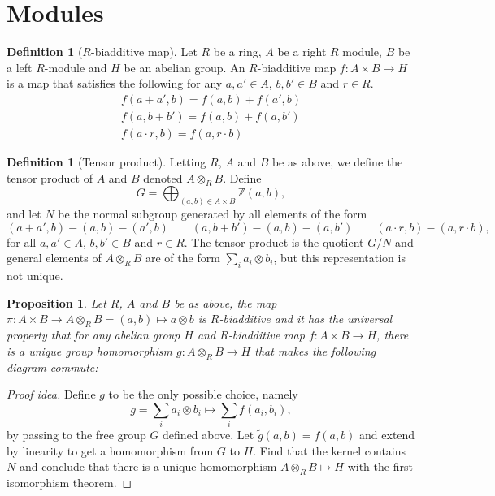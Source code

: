 \documentclass[paper=a4, fontsize=12pt]{scrartcl} %
\newtheorem{prop}[thm]{Proposition}
\theoremstyle{definition}
\newtheorem{defn}[thm]{Definition}
\theoremstyle{remark}
\newcommand{\Z}{\mathbb{Z}}
\begin{document}
\section{Modules}
\begin{defn}[$R$-biadditive map]
	Let $R$ be a ring, $A$ be a right $R$ module, $B$ be a left $R$-module and $H$ be an abelian group. An $R$-biadditive map $f: A\times B \rightarrow H$ is a map that satisfies the following for any $a, a' \in A$, $b,b' \in B$ and $r \in R$.
	\begin{gather*}
		f(a+a', b) = f(a,b) + f(a',b)\\
		f(a,b+b') = f(a,b) + f(a,b')\\
		f(a\cdot r, b) = f(a, r \cdot b)
	\end{gather*}
\end{defn}
\begin{defn}[Tensor product]
	Letting $R$, $A$ and $B$ be as above, we define the tensor product of $A$ and $B$ denoted $A \otimes_R B$. Define
	$$G = \bigoplus_{(a,b) \in A \times B} \Z(a,b),$$
	and let $N$ be the normal subgroup generated by all elements of the form 
	$$(a+a', b)- (a,b)-(a',b) \quad \quad (a,b+b')-(a,b)-(a,b')\quad \quad (a\cdot r, b) - (a, r\cdot b),$$
	for all $a,a' \in A$, $b,b' \in B$ and $r \in R$. The tensor product is the quotient $G/N$ and general elements of $A \otimes_R B$ are of the form $\sum_{i} a_i \otimes  b_i$, but this representation is not unique.
\end{defn}
\begin{prop}
	Let $R$, $A$ and $B$ be as above, the map $\pi: A\times B \rightarrow A\otimes_R B = (a,b) \mapsto a \otimes b$ is $R$-biadditive and it has the universal property that for any abelian group $H$ and $R$-biadditive map $f:A\times B \rightarrow H$, there is a unique group homomorphism $g:A\otimes_R B\rightarrow H$ that makes the following diagram commute:
	\begin{figure}[h]
		\centering
	\end{figure}
\end{prop}
\begin{proof}[Proof idea]
	Define $g$ to be the only possible choice, namely $$g= \sum_i a_i \otimes b_i \mapsto  \sum_i f(a_i,b_i),$$ by passing to the free group $G$ defined above. Let $\tilde{g}(a,b) = f(a,b)$ and extend by linearity to get a homomorphism from $G$ to $H$. Find that the kernel contains $N$ and conclude that there is a unique homomorphism $A\otimes_R B\mapsto H$ with the first isomorphism theorem.
\end{proof}
\end{document}

